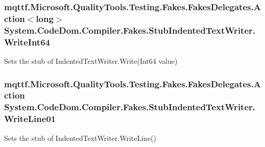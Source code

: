\hypertarget{class_system_1_1_code_dom_1_1_compiler_1_1_fakes_1_1_stub_indented_text_writer_a2fa310e9242551fd667dd839b5177984}{
\subsubsection[{Write\-Int64}]{\setlength{\rightskip}{0pt plus 5cm}mqttf.\-Microsoft.\-Quality\-Tools.\-Testing.\-Fakes.\-Fakes\-Delegates.\-Action$<$long$>$ System.\-Code\-Dom.\-Compiler.\-Fakes.\-Stub\-Indented\-Text\-Writer.\-Write\-Int64}}\label{class_system_1_1_code_dom_1_1_compiler_1_1_fakes_1_1_stub_indented_text_writer_a2fa310e9242551fd667dd839b5177984}


Sets the stub of Indented\-Text\-Writer.\-Write(\-Int64 value)

\hypertarget{class_system_1_1_code_dom_1_1_compiler_1_1_fakes_1_1_stub_indented_text_writer_a9243ad973a6a04dea99ce17c76acbbe6}{
\subsubsection[{Write\-Line01}]{\setlength{\rightskip}{0pt plus 5cm}mqttf.\-Microsoft.\-Quality\-Tools.\-Testing.\-Fakes.\-Fakes\-Delegates.\-Action System.\-Code\-Dom.\-Compiler.\-Fakes.\-Stub\-Indented\-Text\-Writer.\-Write\-Line01}}\label{class_system_1_1_code_dom_1_1_compiler_1_1_fakes_1_1_stub_indented_text_writer_a9243ad973a6a04dea99ce17c76acbbe6}


Sets the stub of Indented\-Text\-Writer.\-Write\-Line()

